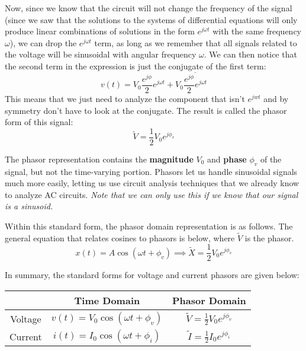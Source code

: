 Now, since we know that the circuit will not change the frequency of the signal (since we saw that the solutions to the systems of differential equations will only produce linear combinations of solutions in the form $e^{j\omega t}$ with the same frequency $\omega$), we can drop the $e^{j\omega t}$ term, as long as we remember that all signals related to the voltage will be sinusoidal with angular frequency $\omega$.
We can then notice that the second term in the expression is just the conjugate of the first term:
\[v(t) = V_0\frac{e^{j\phi}}{2}e^{j\omega t} + V_0 \overline{\frac{e^{j\phi}}{2}e^{j\omega t}}\]
This means that we just need to analyze the component that isn't $e^{jwt}$ and by symmetry don't have to look at the conjugate.
The result is called the phasor form of this signal:
\[\boxed{\widetilde{V}=\frac{1}{2}V_0e^{j\phi_v}}\]

The phasor representation contains the \textbf{magnitude} $V_0$ and \textbf{phase} $\phi_v$ of the signal, but not the time-varying portion. Phasors let us handle sinusoidal signals much more easily, letting us use circuit analysis techniques that we already know to analyze AC circuits. \textit{Note that we can only use this if we know that our signal is a sinusoid.}

Within this standard form, the phasor domain representation is as follows. The general equation that relates cosines to phasors is below, where $\widetilde{V}$ is the phasor.
\[x(t) = A \cos(\omega t + \phi_v) \implies \widetilde{X} =  \frac{1}{2}V_0e^{j\phi_v} \]

In summary, the standard forms for voltage and current phasors are given below:
\begin{center} \begin{tabular}{|c|c|c|}
\hline
        & Time Domain                         & Phasor Domain \\ \hline
Voltage & $v(t) = V_0 \cos(\omega t + \phi_v)$ & $\widetilde{V} = \frac{1}{2} V_0 e^{j\phi_v}$ \\ %
Current & $i(t) = I_0 \cos(\omega t + \phi_i)$ & $\widetilde{I} = \frac{1}{2} I_0 e^{j\phi_i}$ \\%
\hline
\end{tabular} \end{center}

